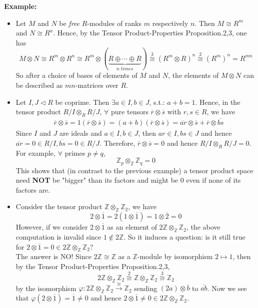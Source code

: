 \noindent\textbf{Example:} \begin{itemize}
    \item Let $M$ and $N$ be \textit{free} $R$-modules of ranks $m$ respectively $n$. Then $M \cong R^m$ and $N \cong R^n$. Hence, by the Tensor Product-Properties Proposition.2,3, one has
    $$M \otimes N \cong R^m \otimes R^n \cong R^m \otimes (\underbrace{R \oplus \cdots \oplus R}_{n\;times}) \overset{3}{\cong} (R^m \otimes R)^n \overset{2}{\cong} (R^m)^n =R^{mn}$$
    So after a choice of bases of elements of $M$ and $N$, the elements of $M \otimes N$ can be described as $mn$-matrices over $R$.

    \item Let $I,J \triangleleft R$ be coprime. Then $\exists a\in I,b\in J$, s.t.: $a+b=1$. Hence, in the tensor product $R/I \otimes_R R/J$, $\forall$ pure tensors $\overline{r} \otimes \overline{s}$ with $r,s \in R$, we have
    \begin{align*}
        &\overline{r} \otimes \overline{s} = 1(\overline{r} \otimes \overline{s}) = (a+b) (\overline{r} \otimes \overline{s}) = \overline{ar} \otimes \overline{s} + \overline{r} \otimes \overline{bs}
    \end{align*}
    Since $I$ and $J$ are ideals and $a\in I,b\in J$, then $ar\in I,bs\in J$ and hence $\overline{ar} =0\in R/I, \overline{bs} =0\in R/J$. Therefore, $\overline{r} \otimes \overline{s}=0$ and hence $R/I \otimes _RR/J =0$.\\
    For example, $\forall$ primes $p\neq q$,
    $$\mathbb{Z}_p \otimes_\mathbb{Z} \mathbb{Z}_q =0$$
    This shows that (in contrast to the previous example) a tensor product space need \textbf{NOT} be "bigger" than its factors and might be $0$ even if none of its factors are.

    \item Consider the tensor product $\mathbb{Z} \otimes _\mathbb{Z} \mathbb{Z}_2$, we have
    $$2\otimes \overline{1} = 2(1\otimes \overline{1}) =1 \otimes \overline{2} =0$$
    However, if we consider $2 \otimes \overline{1}$ as an element of $2 \mathbb{Z} \otimes _\mathbb{Z} \mathbb{Z}_2$, the above computation is invalid since $1\notin 2\mathbb{Z}$. So it induces a question: is it still true for $2 \otimes \overline{1} =0 \in 2\mathbb{Z} \otimes _\mathbb{Z} \mathbb{Z}_2$?\\
    The answer is NO! Since $2 \mathbb{Z} \cong \mathbb{Z}$ as a $\mathbb{Z}$-module by isomorphism $2\mapsto 1$, then by the Tensor Product-Properties Proposition.2,3,
    $$2 \mathbb{Z} \otimes_\mathbb{Z} \mathbb{Z}_2 \overset{2}{\cong} \mathbb{Z} \otimes _\mathbb{Z} \mathbb{Z}_2 \overset{3}{\cong} \mathbb{Z}_2$$
    by the isomorphism $\varphi: 2\mathbb{Z} \otimes _\mathbb{Z} \mathbb{Z}_2 \overset{\cong}{\to} \mathbb{Z}_2$ sending $(2a) \otimes \overline{b}$ to $\overline{ab}$. Now we see that $\varphi (2\otimes \overline{1}) =\overline{1} \neq 0$ and hence $2 \otimes \overline{1} \neq 0 \in 2\mathbb{Z} \otimes _\mathbb{Z} \mathbb{Z}_2$.
\end{itemize}



